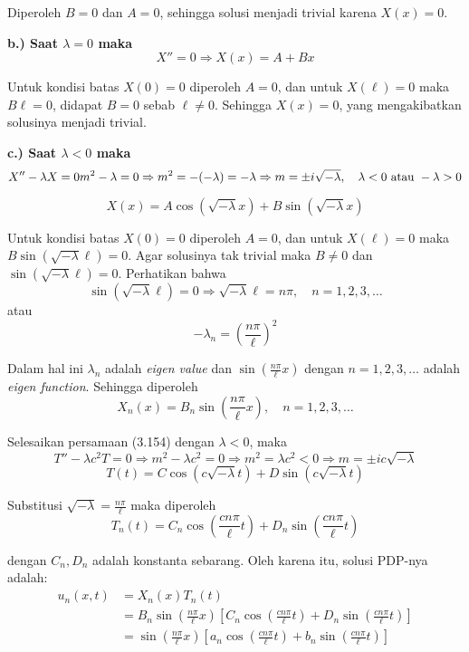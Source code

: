 \documentclass[a4paper]{article}
\theoremstyle{definition}
\begin{document}
Diperoleh \( B = 0 \) dan \( A = 0 \), sehingga solusi menjadi trivial karena \( X(x) = 0 \).

\textbf{b.) Saat \( \lambda = 0 \) maka}
\[
X'' = 0 \Rightarrow X(x) = A + Bx \tag{3.158}
\]

Untuk kondisi batas \( X(0) = 0 \) diperoleh \( A = 0 \), dan untuk \( X(\ell) = 0 \) maka \( B\ell = 0 \), didapat \( B = 0 \) sebab \( \ell \ne 0 \). Sehingga \( X(x) = 0 \), yang mengakibatkan solusinya menjadi trivial.

\textbf{c.) Saat \( \lambda < 0 \) maka}
\[
X'' - \lambda X = 0 \\
m^2 - \lambda = 0 \Rightarrow m^2 = -(-\lambda) = -\lambda \\
\Rightarrow m = \pm i\sqrt{-\lambda},\quad \lambda < 0 \text{ atau } -\lambda > 0
\]

\[
X(x) = A \cos(\sqrt{-\lambda}x) + B \sin(\sqrt{-\lambda}x) \tag{3.159}
\]

Untuk kondisi batas \( X(0) = 0 \) diperoleh \( A = 0 \), dan untuk \( X(\ell) = 0 \) maka \( B \sin(\sqrt{-\lambda} \ell) = 0 \). Agar solusinya tak trivial maka \( B \ne 0 \) dan \( \sin(\sqrt{-\lambda} \ell) = 0 \). Perhatikan bahwa
\[
\sin(\sqrt{-\lambda} \ell) = 0 \Rightarrow \sqrt{-\lambda} \ell = n\pi, \quad n = 1,2,3,\ldots
\]
atau
\[
-\lambda_n = \left( \frac{n\pi}{\ell} \right)^2 \tag{3.160}
\]

Dalam hal ini \( \lambda_n \) adalah \textit{eigen value} dan \( \sin\left( \frac{n\pi}{\ell} x \right) \) dengan \( n = 1,2,3,\ldots \) adalah \textit{eigen function}. Sehingga diperoleh
\[
X_n(x) = B_n \sin\left( \frac{n\pi}{\ell} x \right),\quad n = 1,2,3,\ldots \tag{3.161}
\]

Selesaikan persamaan (3.154) dengan \( \lambda < 0 \), maka
\[
T'' - \lambda c^2 T = 0 \Rightarrow m^2 - \lambda c^2 = 0 \Rightarrow m^2 = \lambda c^2 < 0 \Rightarrow m = \pm ic\sqrt{-\lambda}
\]
\[
T(t) = C \cos(c\sqrt{-\lambda}t) + D \sin(c\sqrt{-\lambda}t) \tag{3.162}
\]

Substitusi \( \sqrt{-\lambda} = \frac{n\pi}{\ell} \) maka diperoleh
\[
T_n(t) = C_n \cos\left( \frac{cn\pi}{\ell} t \right) + D_n \sin\left( \frac{cn\pi}{\ell} t \right) \tag{3.163}
\]

dengan \( C_n, D_n \) adalah konstanta sebarang. Oleh karena itu, solusi PDP-nya adalah:
\begin{align*}
u_n(x,t) &= X_n(x) T_n(t) \\
&= B_n \sin\left( \frac{n\pi}{\ell} x \right) \left[ C_n \cos\left( \frac{cn\pi}{\ell} t \right) + D_n \sin\left( \frac{cn\pi}{\ell} t \right) \right] \\
&= \sin\left( \frac{n\pi}{\ell} x \right) \left[ a_n \cos\left( \frac{cn\pi}{\ell} t \right) + b_n \sin\left( \frac{cn\pi}{\ell} t \right) \right] \tag{3.164}
\end{align*}
\end{document}
